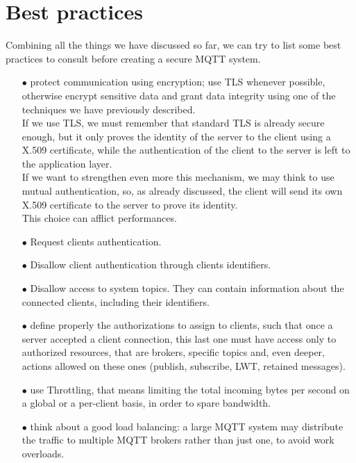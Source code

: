 \documentclass[12pt]{report}
\begin{document}
{{\section{Best practices}
\label{sec:mqttbestpractices}
\bigskip
Combining all the things we have discussed so far, we can try to list some best practices to consult before creating a secure MQTT system.
\bigskip
\begin{itemize}
\setlength{\itemindent}{+4mm}
\item[$\bullet$] protect communication using encryption; use TLS whenever possible, otherwise encrypt sensitive data and grant data integrity using one of the techniques we have previously described.\\
If we use TLS, we must remember that standard TLS is already secure enough, but it only proves the identity of the server to the client using a X.509 certificate, while the authentication of the client to the server is left to the application layer.\\
If we want to strengthen even more this mechanism, we may think to use mutual authentication, so, as already discussed, the client will send its own X.509 certificate to the server to prove its identity.\\
This choice can afflict performances.
\item[$\bullet$] Request clients authentication.%
\item[$\bullet$] Disallow client authentication through clients identifiers.
\item[$\bullet$] Disallow access to system topics. They can contain information about the connected clients, including their identifiers.
\item[$\bullet$] define properly the authorizations to assign to clients, such that once a server accepted a client connection, this last one must have access only to authorized resources, that are brokers, specific topics and, even deeper, actions allowed on these ones (publish, subscribe, LWT, retained messages).
\item[$\bullet$] use Throttling, that means limiting the total incoming bytes per second on a global or a per-client basis, in order to spare bandwidth.
\item[$\bullet$] think about a good load balancing: a large MQTT system may distribute the traffic to multiple MQTT brokers rather than just one, to avoid work overloads.\\

\end{itemize}}}
\end{document}
